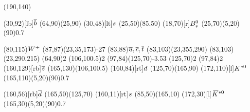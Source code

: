 \documentclass{standalone}
\begin{document}
\begin{axopicture}(190,140)

  \Text(30,92)[lb]{${\overline {{b}}}$}                           %
  \Line[arrow](64,90)(25,90)                               %
  \Text(30,48)[lt]{${s}$}                              %
  \Line[arrow](25,50)(85,50)                               %
  \Text(18,70)[r]{${{B}^0_{s}}$}                                   %
  \GOval(25,70)(5,20)(90){0.7}                             %
                                                           
  \Text(80,115){\small{${W^+}$}}                             %
  \PhotonArc(87,87)(23,35,173){-2}{7}                      %
  \Text(83,88){${\overline {{u}}}, {\overline {{c}}}, {\overline {{t}}}$}       %
  \Arc[arrow,clockwise,arrowpos=0.4](83,103)(23,355,290)   %
  \Arc[arrow,clockwise,arrowpos=0.4](83,103)(23,290,215)   %
  \Vertex(64,90){2}                                        %
  \Vertex(106,100.5){2}                                    %
  \Gluon(97,84)(125,70){-3.5}{3}                           %
  \Vertex(125,70){2}                                       %
  \Vertex(97,84){2}                                        %
  \Text(160,129)[rb]{${\overline {{s}}}$}                         %
  \Line[arrow](165,130)(106,100.5)                         %
  \Text(160,84)[rt]{${d}$}                             %
  \Line[arrow](125,70)(165,90)                             %
  \Text(172,110)[l]{${{K}^{*0}}$}                             %
  \GOval(165,110)(5,20)(90){0.7}                           %
                                                           
  \Text(160,56)[rb]{${\overline {{d}}}$}                          %
  \Line[arrow](165,50)(125,70)                             %
  \Text(160,11)[rt]{${s}$}                             %
  \Line[arrow](85,50)(165,10)                              %
  \Text(172,30)[l]{${{\kern 0.18em\overline{\kern -0.18em K}}{}^{*0}}$}                             %
  \GOval(165,30)(5,20)(90){0.7}                            %
                                                           
\end{axopicture}
\end{document}
